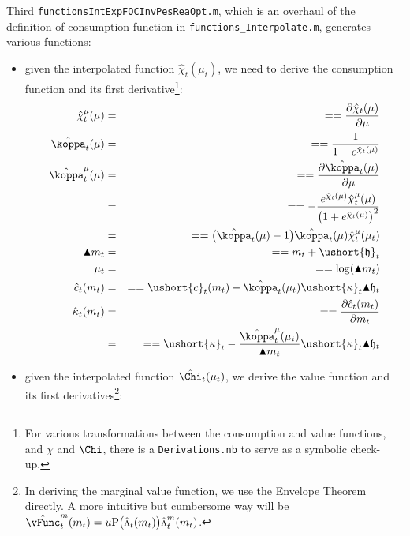 \documentclass[titlepage,abstract]{\econtex}
\providecommand{\vInv}{\ensuremath{\scriptstyle \Lambda \displaystyle}}
\begin{document}
Third \texttt{functionsIntExpFOCInvPesReaOpt.m}, which is an overhaul of the definition of consumption function in \texttt{functions\_Interpolate.m}, generates various functions:
\begin{itemize}
        \item given the interpolated function $\hat{\chi}_{t}(\mu_{t})$, we need to derive the consumption function and its first derivative\footnote{For various transformations between the consumption and value functions, and $\chi$ and $\Chi$, there is a \texttt{Derivations.nb} to serve as a symbolic check-up.}:
            \begin{equation}\begin{gathered}\begin{aligned}
            \hat{\chi}^{\mu}_{t}(\mu)   &=& =  =  \frac{\partial \hat{\chi}_{t}(\mu)}{\partial \mu} \\
            \hat{\koppa}_{t} (\mu)   &=& =  = \frac{1}{1+e^{\hat{\chi}_{t}(\mu)}} \\
            \hat{\koppa}^{\mu}_{t} (\mu)   &=& =  =  \frac{\partial \hat{\koppa}_{t} (\mu)}{\partial \mu} \\
              &=& =  =  -\frac{e^{\hat{\chi}_{t}(\mu)} \hat{\chi}^{\mu}_{t}(\mu)}{\big(1+e^{\hat{\chi}_{t}(\mu)}\big)^{2}} \\
              &=& =  =  \big(\hat{\koppa}_{t} (\mu)-1\big)\hat{\koppa}_{t} (\mu) \hat{\chi}^{\mu}_{t}(\mu_{t}) \\
            \blacktriangle m_{t}   &=& =  =  m_{t} + \ushort{\mathfrak{h}}_{t} \\
            \mu_{t}   &=& =  =  \log(\blacktriangle m_{t}) \\
            \hat{c}_{t}(m_{t})   &=& =  =  \ushort{c}_{t}(m_{t})-\hat{\koppa}_{t}(\mu_{t}) \ushort{\kappa}_{t} \blacktriangle \mathfrak{h}_{t} \\
            \hat{\kappa}_{t}(m_{t})   &=& =  =  \frac{\partial \hat{c}_{t}(m_{t})}{\partial m_{t}} \\
              &=& =  =  \ushort{\kappa}_{t}-\frac{\hat{\koppa}^{\mu}_{t}(\mu_{t})}{\blacktriangle m_{t}} \ushort{\kappa}_{t} \blacktriangle \mathfrak{h}_{t} \\
            \end{aligned}\end{gathered}\end{equation}
        \item given the interpolated function $\hat{\Chi}_{t}(\mu_{t})$, we derive the value function and its first derivatives\footnote{In deriving the marginal value function, we use the Envelope Theorem directly. A more intuitive but cumbersome way will be $\hat{\vFunc}_{t}^{m} (m_{t}) = u\text{P}\big(\hat{\vInv}_{t}(m_{t})\big) \hat{\vInv}_{t}^{m} (m_{t})$.}:

\end{itemize}
\end{document}
